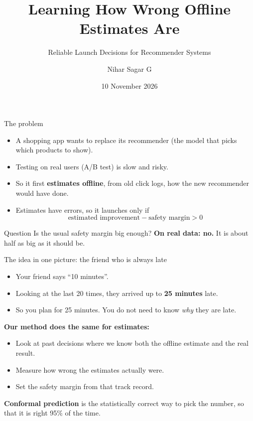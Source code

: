 \documentclass[aspectratio=169,11pt]{beamer}
\title{Learning How Wrong Offline Estimates Are}
\subtitle{Reliable Launch Decisions for Recommender Systems}
\author{Nihar Sagar G}
\institute{EECE, IIT Dharwad \\ PRML Course Project}
\date{10 November 2026}
\begin{document}
\begin{frame}
\titlepage
\end{frame}

\begin{frame}{The problem}
\begin{itemize}
  \item A shopping app wants to replace its recommender (the model that picks which products to show).
  \item Testing on real users (A/B test) is slow and risky.
  \item So it first \textbf{estimates offline}, from old click logs, how the new recommender would have done.
  \item Estimates have errors, so it launches only if
  \[ \text{estimated improvement} - \text{safety margin} > 0 \]
\end{itemize}
\vspace{0.5em}
\begin{block}{Question}
Is the usual safety margin big enough? \textbf{On real data: no.} It is about half as big as it should be.
\end{block}
\end{frame}

\begin{frame}{The idea in one picture: the friend who is always late}
\begin{itemize}
  \item Your friend says ``10 minutes''.
  \item Looking at the last 20 times, they arrived up to \textbf{25 minutes} late.
  \item So you plan for 25 minutes. You do not need to know \emph{why} they are late.
\end{itemize}
\vspace{0.8em}
\textbf{Our method does the same for estimates:}
\begin{itemize}
  \item Look at past decisions where we know both the offline estimate and the real result.
  \item Measure how wrong the estimates actually were.
  \item Set the safety margin from that track record.
\end{itemize}
\vspace{0.5em}
\textbf{Conformal prediction} is the statistically correct way to pick the number, so that it is right 95\% of the time.
\end{frame}
\end{document}
